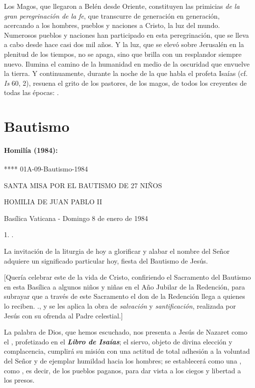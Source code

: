 \begin{body}
	Los Magos, que llegaron a Belén desde Oriente, constituyen las primicias \emph{de la gran peregrinación de la fe}, que transcurre de generación en generación, acercando a los hombres, pueblos y naciones a Cristo, la luz del mundo. Numerosos pueblos y naciones han participado en esta peregrinación, que se lleva a cabo desde hace casi dos mil años. Y la luz, que se elevó sobre Jerusalén en la plenitud de los tiempos, no se apaga, sino que brilla con un resplandor siempre nuevo. Ilumina el camino de la humanidad en medio de la oscuridad que envuelve la tierra. Y continuamente, durante la noche de la que habla el profeta Isaías (cf. \emph{Is} 60, 2), resuena el grito de los pastores, de los magos, de todos los creyentes de todas las épocas: .

	\chapter{Bautismo}

	\subsubsection{Homilía (1984):} **** 01A-09-Bautismo-1984

	SANTA MISA POR EL BAUTISMO DE 27 NIÑOS

	HOMILIA DE JUAN PABLO II

	Basílica Vaticana - Domingo 8 de enero de 1984

	1. .

	La invitación de la liturgia de hoy a glorificar y alabar el nombre del Señor adquiere un significado particular hoy, fiesta del Bautismo de Jesús.

	{[}Quería celebrar este  de la vida de Cristo, confiriendo el Sacramento del Bautismo en esta Basílica a algunos niños y niñas en el Año Jubilar de la Redención, para subrayar que a través de este Sacramento el don de la Redención llega a quienes lo reciben. ., y se les aplica la obra de \emph{salvación} y \emph{santificación}, realizada por Jesús con su ofrenda al Padre celestial.{]}

	La palabra de Dios, que hemos escuchado, nos presenta a Jesús de Nazaret como el , profetizado en el \emph{\textbf{Libro de Isaías}}; el siervo, objeto de divina elección y complacencia, cumplirá su misión con una actitud de total adhesión a la voluntad del Señor y de ejemplar humildad hacia los hombres; se establecerá como una , como , es decir, de los pueblos paganos, para dar vista a los ciegos y libertad a los presos.


\end{body}
